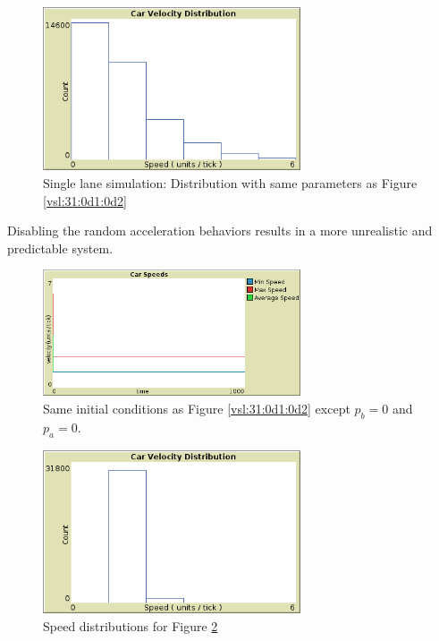 \documentclass{article}%
\begin{document}
    \begin{figure}[ht!]
        \centering
        \includegraphics[width=3in]{../img/VelDistroSingleLane.png}
        \caption{Single lane simulation: Distribution with same parameters as Figure \ref{vsl:31:0d1:0d2}}
        \label{vsl:d31:0d1:0d2}
    \end{figure}

    Disabling the random acceleration behaviors results in a more unrealistic and predictable system. 

    \begin{figure}[ht!]
        \centering
        \includegraphics[width=3in]{../img/VelocitiesSingleLane_pb0pa0.png}
        \caption{Same initial conditions as Figure \ref{vsl:31:0d1:0d2} except $p_b = 0$ and $p_a = 0$.}
        \label{vsl:31:0d0:0d0}
    \end{figure}
 
    \begin{figure}[ht!]
        \centering
        \includegraphics[width=3in]{../img/VelDistroSingleLane_pb0pa0.png}
        \caption{Speed distributions for Figure \ref{vsl:31:0d0:0d0}}
        \label{vsl:d31:0d0:0d0}
    \end{figure}
\end{document}
